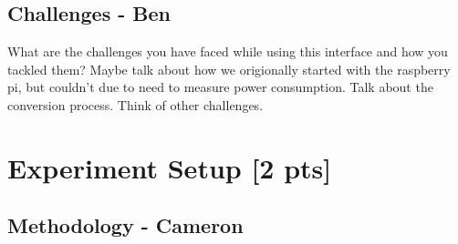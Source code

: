 \documentclass[sigconf,authorversion,nonacm]{acmart}
\begin{document}
\subsection{Challenges - Ben}
What are the challenges you have faced while using this interface and how you tackled them?
Maybe talk about how we origionally started with the raspberry pi, but couldn't due to need to measure power consumption. Talk about the conversion process. Think of other challenges.

\section{Experiment Setup  {\small {[2 pts]}}}

\subsection{Methodology - Cameron}  
\end{document}

